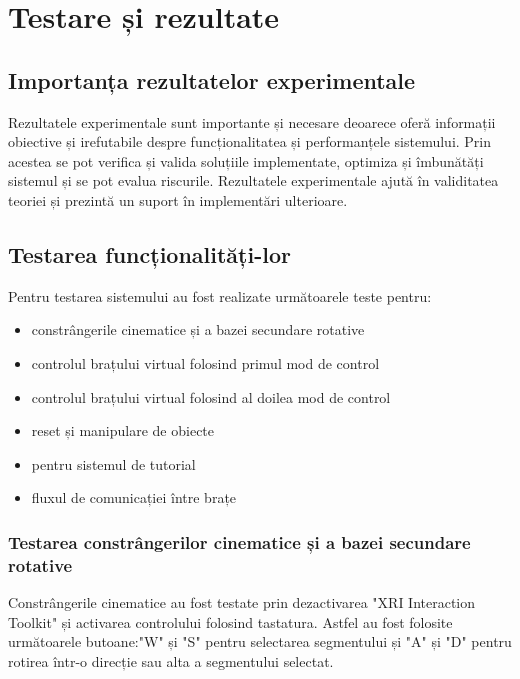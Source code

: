 
\clearpage



\section{Testare și rezultate}
\subsection{Importanța rezultatelor experimentale}
Rezultatele experimentale sunt importante și necesare deoarece oferă informații obiective și irefutabile despre funcționalitatea și performanțele sistemului. Prin acestea se pot verifica și valida soluțiile implementate, optimiza și îmbunătăți sistemul și se  pot evalua riscurile. Rezultatele experimentale ajută în validitatea teoriei și prezintă un suport în implementări ulterioare.

\subsection{Testarea funcționalități-lor}

Pentru testarea sistemului au fost realizate următoarele teste pentru:
\begin{itemize}
	\item constrângerile cinematice și a bazei secundare rotative
	\item controlul brațului virtual folosind primul mod de control
	\item controlul brațului virtual folosind al doilea mod de control
	\item reset și manipulare de obiecte
	\item pentru sistemul de tutorial
	\item fluxul de comunicației între brațe
\end{itemize}

\subsubsection{Testarea constrângerilor cinematice și a bazei secundare rotative}


Constrângerile cinematice au fost testate prin dezactivarea "XRI Interaction Toolkit" și activarea controlului folosind tastatura. Astfel au fost folosite următoarele butoane:"W" și "S" pentru selectarea segmentului și "A" și "D" pentru rotirea într-o direcție sau alta a segmentului selectat. 

